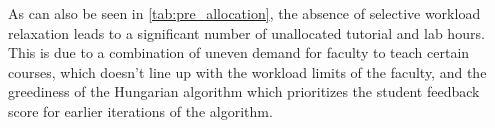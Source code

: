 As can also be seen in \autoref{tab:pre_allocation}, the absence of selective workload relaxation leads to a significant number of unallocated tutorial and lab hours. This is due to a combination of uneven demand for faculty to teach certain courses, which doesn't line up with the workload limits of the faculty, and the greediness of the Hungarian algorithm which prioritizes the student feedback score for earlier iterations of the algorithm.

\begin{table}[H]
  \centering
  \caption{Impact of Selective Workload Relaxation on Tutorials}
  \label{tab:dynamic_adjustment_tutorials}
\end{table}

